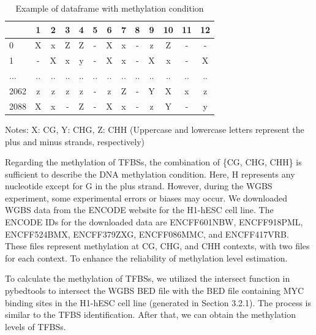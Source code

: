 \documentclass{PHlab-thesis}
\begin{document}
\begin{table}[H]
	\centering
	\begin{tabular}{l*{12}{c}}
		\toprule
		         & 1 &  2&  3&4  &5&6&7&8&  9& 10 & 11&12\\
		\midrule
	
		0     &X  &x  &Z  &Z  &-  &X  &x & -  &z  &Z  &-  &-\\
		1     &-  &X  &x  &y  &-  &X  &x  &-  &X  &x  &-  &X\\
		...   &.. &.. &.. &.. &.. &.. &.. &.. &.. &.. &.. &..\\
		2062  &z  &z  &z  &z  &-  &z  &Z  &- &Y   &X &x  &z\\
		2088  &X  &x  &-  &Z  &-  &X  &x  &-  &z  &Y  &-  &y\\
		\bottomrule

	\end{tabular}
	\begin{minipage}{9.5cm}
		\vspace{0.15cm}
		\footnotesize  Notes: X: CG, Y: CHG, Z: CHH (Uppercase and lowercase letters represent the plus and minus strands, respectively)
		\end{minipage}
	\caption{Example of dataframe with methylation condition}
	\label{table:ctx}
\end{table}

Regarding the methylation of TFBSs, the combination of \{CG, CHG, CHH\} is sufficient to describe the DNA methylation condition. Here, H represents any nucleotide except for G in the plus strand. However, during the WGBS experiment, some experimental errors or biases may occur.  We downloaded WGBS data from the ENCODE website for the H1-hESC cell line. The ENCODE IDs for the downloaded data are ENCFF601NBW, ENCFF918PML, ENCFF524BMX, ENCFF379ZXG, ENCFF086MMC, and ENCFF417VRB. These files represent methylation at CG, CHG, and CHH contexts, with two files for each context. To enhance the reliability of methylation level estimation.

To calculate the methylation of TFBSs, we utilized the intersect function in pybedtools to intersect the WGBS BED file with the BED file containing MYC binding sites in the H1-hESC cell line (generated in Section 3.2.1). The process is similar to the TFBS identification. After that, we can obtain the methylation levels of TFBSs.
\end{document}
